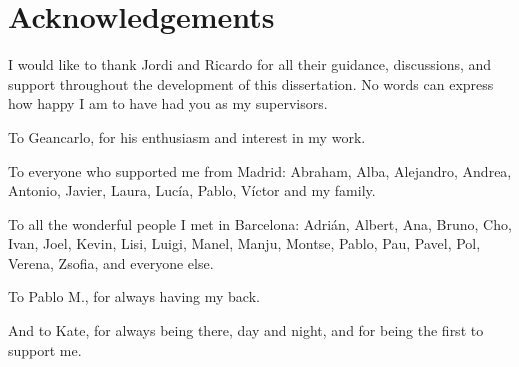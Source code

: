 \clearpage
\newpage
\section*{Acknowledgements}

I would like to thank Jordi and Ricardo for all their guidance, discussions, and
support throughout the development of this dissertation.
No words can express how happy I am to have had you as my supervisors. 


To Geancarlo, for his enthusiasm and interest in my work.


To everyone who supported me from Madrid: Abraham, Alba, Alejandro, Andrea,
Antonio, Javier, Laura, Lucía, Pablo, Víctor and my family.


To all the wonderful people I met in Barcelona: Adrián, Albert, Ana, Bruno, Cho, Ivan,
Joel, Kevin, Lisi, Luigi, Manel, Manju, Montse, Pablo, Pau, Pavel, Pol, Verena, Zsofia,
and everyone else.


To Pablo M., for always having my back.


And to Kate, for always being there, day and night, and for being the first to support me.
